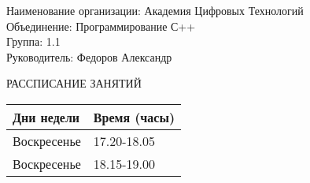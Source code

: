 \documentclass{article}
\begin{document}
\noindent
\vspace{2mm} %
 {Наименование организации: 
Академия Цифровых Технологий
 }
 \\
 \vspace{2mm} %
 {Объединение: 
Программирование С++
 }
 \\
 \vspace{2mm} %
 {Группа: 
1.1
 }
\\
 \vspace{2mm} %
 {Руководитель: 
Федоров Александр
 }
\\
\begin{center}
{ РАССПИСАНИЕ ЗАНЯТИЙ }
\\
 \vspace{8mm} %
 

\begin{tabular}{ |P{4cm}|P{7cm}|}
\hline
Дни недели&Время (часы)
\\ \hline
Воскресенье&17.20-18.05\\ \hline
Воскресенье&18.15-19.00\\ \hline

\end{tabular}


 \end{center}
 \restoregeometry
 

\clearpage
\end{document}
